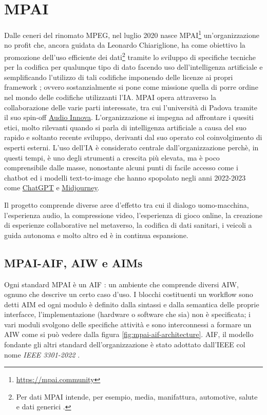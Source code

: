 
\chapter{MPAI} \label{chp:mpai}

Dalle ceneri del rinomato \ac{MPEG}, nel luglio 2020 nasce \ac{MPAI}\footnote{\url{https://mpai.community}} un'organizzazione no profit che, ancora guidata da Leonardo Chiariglione, ha come obiettivo la promozione dell'uso efficiente dei dati\footnote{Per dati \ac{MPAI} intende, per esempio, media, manifattura, automotive, salute e dati generici \cite{mpaiMPAICommunity}.} tramite lo sviluppo di specifiche tecniche per la codifica per qualunque tipo di dato facendo uso dell'intelligenza artificiale e semplificando l'utilizzo di tali codifiche imponendo delle licenze ai propri framework \cite{mpaiMPAICommunity}; ovvero sostanzialmente si pone come missione quella di porre ordine nel mondo delle codifiche utilizzanti l'IA. %
\ac{MPAI} opera attraverso la collaborazione delle varie parti interessate, tra cui l'università di Padova tramite il suo spin-off \href{www.audioinnova.com}{Audio Innova}.
L'organizzazione si impegna ad affrontare i quesiti etici, molto rilevanti quando si parla di intelligenza artificiale a causa del suo rapido e soltanto recente sviluppo, derivanti dal suo operato col coinvolgimento di esperti esterni. %
L'uso dell'IA è considerato centrale dall'organizzazione perchè, in questi tempi, è uno degli strumenti a crescita più elevata, ma è poco comprensibile dalle masse, nonostante alcuni punti di facile accesso come i chatbot ed i modelli text-to-image che hanno spopolato negli anni 2022-2023 come \href{https://chat.openai.com}{ChatGPT} e \href{www.midjourney.com}{Midjourney}. %

Il progetto comprende diverse aree d'effetto tra cui il dialogo uomo-macchina, l'esperienza audio, la compressione video, l'esperienza di gioco online, la creazione di esperienze collaborative nel metaverso, la codifica di dati sanitari, i veicoli a guida autonoma e molto altro ed è in continua espansione. %

\section{MPAI-AIF, AIW e AIMs} \label{sec:aif-aiw-aim}
Ogni standard \ac{MPAI} è un \ac{AIF} \cite{mpaiMPAIAIFMPAICommunity}: un ambiente che comprende diversi \ac{AIW}, ognuno che descrive un certo caso d'uso. I blocchi costituenti un workflow sono detti \ac{AIM} ed ogni modulo è definito dalla sintassi e dalla semantica delle proprie interfacce, l'implementazione (hardware o software che sia) non è specificata; i vari moduli svolgono delle specifiche attività e sono interconnessi a formare un AIW come si può vedere dalla figura \ref{fig:mpai-aif-architecture}.
\acs{AIF}, il modello fondante gli altri standard dell'organizzazione è stato adottato dall'\ac{IEEE} col nome \textit{IEEE 3301-2022} \cite{ieeeStandard3301-2022}.

